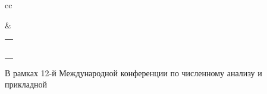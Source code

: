 \begin{tabular}{cc}








&


\tabcolsep=0pt\begin{tabular}{c}


{\prg{\Large\textbf{Специальная сессия}}}\\[6pt]


{\prg{\Large\textbf{<<Прикладные проблемы теории вероятностей}}}\\[6pt]




{\prg{\Large\textbf{и математической статистики, относящиеся}}}\\[6pt]




{\prg{\Large\textbf{к моделированию информационных систем>>}}}\\[6pt]


{\prg{\large 22--28 сентября 2014~г.}}\\[3pt]




{\prg{\large  Родос, Греция}}


\end{tabular}


\end{tabular}











\vspace*{8mm}





В рамках 12-й Международной конференции по численному анализу и прикладной 


